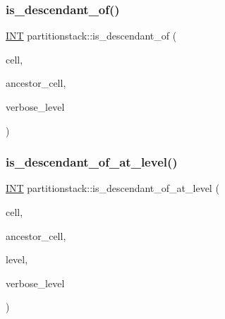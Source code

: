 \subsubsection{\texorpdfstring{is\+\_\+descendant\+\_\+of()}{is\_descendant\_of()}}
{\footnotesize\ttfamily \mbox{\hyperlink{galois_8h_a09fddde158a3a20bd2dcadb609de11dc}{I\+NT}} partitionstack\+::is\+\_\+descendant\+\_\+of (\begin{DoxyParamCaption}\item[{\mbox{\hyperlink{galois_8h_a09fddde158a3a20bd2dcadb609de11dc}{I\+NT}}}]{cell,  }\item[{\mbox{\hyperlink{galois_8h_a09fddde158a3a20bd2dcadb609de11dc}{I\+NT}}}]{ancestor\+\_\+cell,  }\item[{\mbox{\hyperlink{galois_8h_a09fddde158a3a20bd2dcadb609de11dc}{I\+NT}}}]{verbose\+\_\+level }\end{DoxyParamCaption})}

\mbox{\label{classpartitionstack_a9342195487ada674e013bd207638c6e3}} 
\subsubsection{\texorpdfstring{is\+\_\+descendant\+\_\+of\+\_\+at\+\_\+level()}{is\_descendant\_of\_at\_level()}}
{\footnotesize\ttfamily \mbox{\hyperlink{galois_8h_a09fddde158a3a20bd2dcadb609de11dc}{I\+NT}} partitionstack\+::is\+\_\+descendant\+\_\+of\+\_\+at\+\_\+level (\begin{DoxyParamCaption}\item[{\mbox{\hyperlink{galois_8h_a09fddde158a3a20bd2dcadb609de11dc}{I\+NT}}}]{cell,  }\item[{\mbox{\hyperlink{galois_8h_a09fddde158a3a20bd2dcadb609de11dc}{I\+NT}}}]{ancestor\+\_\+cell,  }\item[{\mbox{\hyperlink{galois_8h_a09fddde158a3a20bd2dcadb609de11dc}{I\+NT}}}]{level,  }\item[{\mbox{\hyperlink{galois_8h_a09fddde158a3a20bd2dcadb609de11dc}{I\+NT}}}]{verbose\+\_\+level }\end{DoxyParamCaption})}

\mbox{\label{classpartitionstack_ab4968687c725a00a1b57f5c6dc7c2f3b}} 

